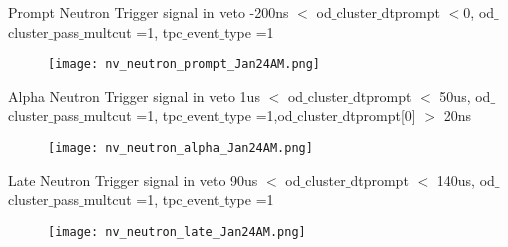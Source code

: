 \documentclass[9pt]{beamer}
\begin{document}
\begin{frame}{Prompt Neutron Trigger signal in veto}
-200ns $<$ od$\_$cluster$\_$dtprompt $<$0, od$\_$cluster$\_$pass$\_$multcut =1,  tpc$\_$event$\_$type =1

\begin{figure}
\texttt{[image: nv\_neutron\_prompt\_Jan24AM.png]}
\end{figure}
\end{frame}

\begin{frame}{Alpha Neutron Trigger signal in veto}
1us $<$ od$\_$cluster$\_$dtprompt $<$ 50us, od$\_$cluster$\_$pass$\_$multcut =1,  tpc$\_$event$\_$type =1,od$\_$cluster$\_$dtprompt[0] $>$ 20ns

\begin{figure}
\texttt{[image: nv\_neutron\_alpha\_Jan24AM.png]}
\end{figure}
\end{frame}

\begin{frame}{Late Neutron Trigger signal in veto}
90us $<$ od$\_$cluster$\_$dtprompt $<$ 140us, od$\_$cluster$\_$pass$\_$multcut =1,  tpc$\_$event$\_$type =1

\begin{figure}
\texttt{[image: nv\_neutron\_late\_Jan24AM.png]}
\end{figure}
\end{frame}
\end{document}
